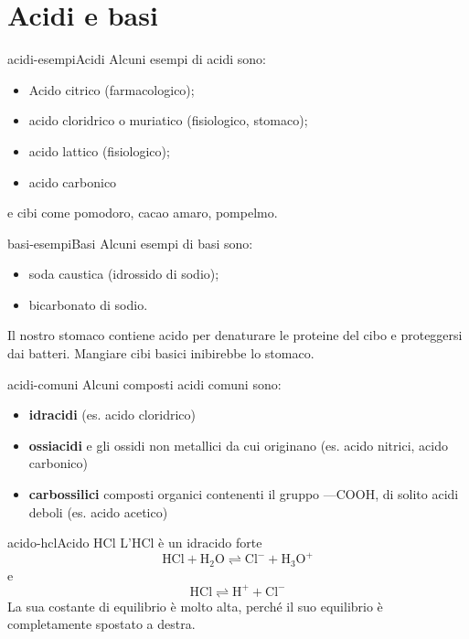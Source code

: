\documentclass[preview]{standalone}
\begin{document}
\genpage

\section{Acidi e basi}

\begin{snippetexample}{acidi-esempi}{Acidi}
    Alcuni esempi di acidi sono:
    \begin{itemize}
        \item Acido citrico (farmacologico);
        \item acido cloridrico o muriatico (fisiologico, stomaco);
        \item acido lattico (fisiologico);
        \item acido carbonico
    \end{itemize}
    e cibi come pomodoro, cacao amaro, pompelmo.
\end{snippetexample}

\begin{snippetexample}{basi-esempi}{Basi}
    Alcuni esempi di basi sono:
    \begin{itemize}
        \item soda caustica (idrossido di sodio);
        \item bicarbonato di sodio.
    \end{itemize}
\end{snippetexample}

\begin{plainhtml}
    Il nostro stomaco contiene acido per denaturare le proteine
    del cibo e proteggersi dai batteri.
    Mangiare cibi basici inibirebbe lo stomaco.
\end{plainhtml}

\begin{snippet}{acidi-comuni}
    Alcuni composti acidi comuni sono:
    \begin{itemize}
        \item \textbf{idracidi} (es. acido cloridrico)
        \item \textbf{ossiacidi} e gli ossidi non metallici da cui originano (es. acido nitrici, acido carbonico)
        \item \textbf{carbossilici} composti organici contenenti il gruppo —COOH,
            di solito acidi deboli (es. acido acetico)
    \end{itemize}
\end{snippet}

\begin{snippetexample}{acido-hcl}{Acido HCl}
    L'HCl è un idracido forte
    \[
        \text{HCl} + \text{H}_2\text{O} \rightleftharpoons \text{Cl}^- + \text{H}_3\text{O}^+
    \]
    e
    \[
        \text{HCl} \rightleftharpoons \text{H}^+ + \text{Cl}^-
    \]
    La sua costante di equilibrio è molto alta, perché il suo equilibrio è completamente spostato a destra.
\end{snippetexample}
\end{document}
